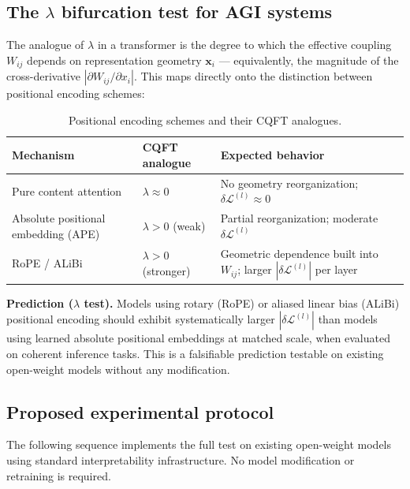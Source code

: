 \documentclass[12pt,a4paper]{article}
\theoremstyle{plain}
\theoremstyle{definition}
\begin{document}
\subsection{The $\lambda$ bifurcation test for AGI systems}
\label{subsec:lambda_bifurcation}

The analogue of $\lambda$ in a transformer is the degree to which the
effective coupling $W_{ij}$ depends on representation geometry
$\mathbf{x}_i$ --- equivalently, the magnitude of the cross-derivative
$|\partial W_{ij}/\partial x_i|$. This maps directly onto the distinction
between positional encoding schemes:

\begin{table}[H]
\centering
\caption{Positional encoding schemes and their CQFT analogues.}
\label{tab:pos_enc}
\begin{tabular}{p{4.2cm} p{3cm} p{5.5cm}}
\toprule
\textbf{Mechanism} & \textbf{CQFT analogue} & \textbf{Expected behavior} \\
\midrule
Pure content attention & $\lambda \approx 0$ &
  No geometry reorganization; $\delta\mathcal{L}^{(l)} \approx 0$ \\[4pt]
Absolute positional embedding (APE) & $\lambda > 0$ (weak) &
  Partial reorganization; moderate $\delta\mathcal{L}^{(l)}$ \\[4pt]
RoPE / ALiBi & $\lambda > 0$ (stronger) &
  Geometric dependence built into $W_{ij}$;
  larger $|\delta\mathcal{L}^{(l)}|$ per layer \\
\bottomrule
\end{tabular}
\end{table}

\begin{keyresult}
\textbf{Prediction ($\lambda$ test).} Models using rotary (RoPE) or
aliased linear bias (ALiBi) positional encoding should exhibit
systematically larger $|\delta\mathcal{L}^{(l)}|$ than models using
learned absolute positional embeddings at matched scale, when evaluated
on coherent inference tasks. This is a falsifiable prediction testable
on existing open-weight models without any modification.
\end{keyresult}

\subsection{Proposed experimental protocol}
\label{subsec:protocol}

The following sequence implements the full test on existing open-weight
models using standard interpretability infrastructure. No model
modification or retraining is required.
\end{document}
